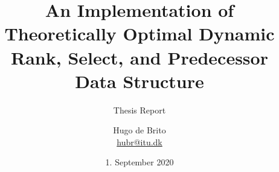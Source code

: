 
\titlehead{
    \texttt{[image: 03\_GraphicFiles/logo\_en.png]}
}

\subject{MSc Software Development}

\title{An Implementation of Theoretically Optimal Dynamic Rank, Select, and Predecessor Data Structure}

\subtitle{Thesis Report}

\author{Hugo de Brito\\
\href{mailto:hubr@itu.dk}{{\ttfamily hubr@itu.dk}}}

\date{1. September 2020}

\publishers{{\small Supervisor}\\Holger Dell\\
\href{mailto:hold@itu.dk}{{\ttfamily hold@itu.dk}}}

\maketitle